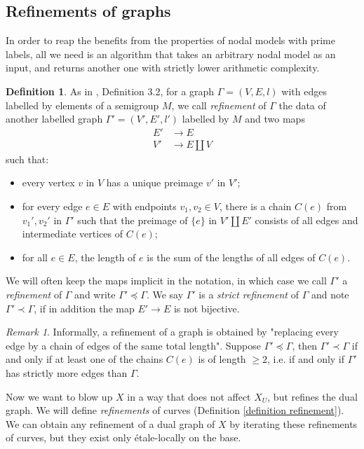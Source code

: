 \documentclass[a4paper,10pt,twoside]{article}
\theoremstyle{definition}
\newtheorem{defi}[thm]{Definition}
\theoremstyle{remark}
\newtheorem{rem}{Remark}[thm]
\begin{document}
\subsection{Refinements of graphs}
In order to reap the benefits from the properties of nodal models with prime labels, all we need is an algorithm that takes an arbitrary nodal model as an input, and returns another one with strictly lower arithmetic complexity.

\begin{defi}\label{definition refinements of graphs}
	As in \cite{Holmes}, Definition 3.2, for a graph $\Gamma=(V,E,l)$ with edges labelled by elements of a semigroup $M$, we call \emph{refinement} of $\Gamma$ the data of another labelled graph $\Gamma'=(V',E',l')$ labelled by $M$ and two maps
\begin{align*}
E' & \to E \\
V' & \to E \coprod V
\end{align*}	
	such that:
	\begin{itemize}
	\item every vertex $v$ in $V$ has a unique preimage $v'$ in $V'$;
	\item for every edge $e\in E$ with endpoints $v_1,v_2\in V$, there is a chain $C(e)$ from $v_1',v_2'$ in $\Gamma'$ such that the preimage of $\{e\}$ in $V' \coprod E'$ consists of all edges and intermediate vertices of $C(e)$;
	\item for all $e\in E$, the length of $e$ is the sum of the lengths of all edges of $C(e)$.
	\end{itemize}
	We will often keep the maps implicit in the notation, in which case we call $\Gamma'$ a \emph{refinement} of $\Gamma$ and write $\Gamma'\preceq\Gamma$. We say $\Gamma'$ is a \emph{strict refinement} of $\Gamma$ and note $\Gamma'\prec\Gamma$, if in addition the map $E' \to E$ is not bijective.
\end{defi}

\begin{rem}
Informally, a refinement of a graph is obtained by "replacing every edge by a chain of edges of the same total length". Suppose $\Gamma'\preceq\Gamma$, then $\Gamma'\prec\Gamma$ if and only if at least one of the chains $C(e)$ is of length $\geq 2$, i.e. if and only if $\Gamma'$ has strictly more edges than $\Gamma$.
\end{rem}


Now we want to blow up $X$ in a way that does not affect $X_U$, but refines the dual graph. We will define \emph{refinements} of curves (Definition \ref{definition refinement}). We can obtain any refinement of a dual graph of $X$ by iterating these refinements of curves, but they exist only \'etale-locally on the base.
\end{document}
